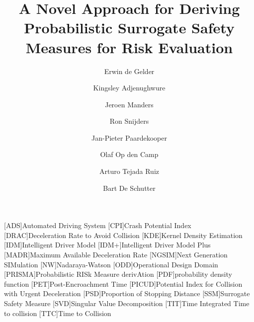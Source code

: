 \documentclass[3p,onecolumn,authoryear]{elsarticle}
\title{\cstarta A Novel \cenda Approach for Deriving Probabilistic Surrogate Safety Measures for Risk Evaluation}
\author[1,2]{Erwin de Gelder\corref{cor1}}
\author[3]{Kingsley Adjenughwure}
\author[1]{Jeroen Manders}
\author[4]{Ron Snijders}
\author[1,5]{Jan-Pieter Paardekooper}
\author[1]{Olaf Op den Camp}
\author[1,6]{Arturo Tejada Ruiz}
\author[1,2]{Bart De Schutter}
\date{}
\begin{document}
\begin{acronym}[AAAAAAAA]
	[ADS]{Automated Driving System}
	[CPI]{Crash Potential Index}
	[DRAC]{Deceleration Rate to Avoid Collision}
	[KDE]{Kernel Density Estimation}
	[IDM]{Intelligent Driver Model}
	[IDM+]{Intelligent Driver Model Plus}
	[MADR]{Maximum Available Deceleration Rate}
	[NGSIM]{Next Generation SIMulation}
	[NW]{Nadaraya-Watson}
	[ODD]{Operational Design Domain}
	[PRISMA]{Probabilistic RISk Measure derivAtion}
	[PDF]{probability density function}
	[PET]{Post-Encroachment Time}
	[PICUD]{Potential Index for Collision with Urgent Deceleration}
	[PSD]{Proportion of Stopping Distance}
	[SSM]{Surrogate Safety Measure}
	[SVD]{Singular Value Decomposition}
	[TIT]{Time Integrated Time to collision}
	[TTC]{Time to Collision}
\end{acronym}



\maketitle
\acresetall




\acresetall







\end{document}
